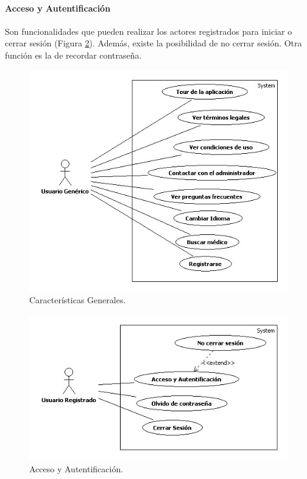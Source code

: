 		
			\paragraph{Acceso y Autentificación} %
			\label{par:acceso_y_autentificacion}
				Son funcionalidades que pueden realizar los actores registrados para iniciar o cerrar sesión (Figura \ref{fig:acceso}). Además, existe la posibilidad de no cerrar sesión. Otra función es la de recordar contraseña.
				\begin{figure}[H]
				  \centering
				    \includegraphics[width=12cm]{img/jpg/casos_uso/Generales.jpg}
				  \caption{Características Generales.}
				  \label{fig:caracteristicas}
				\end{figure}
				
				\begin{figure}[H]
				  \centering
				    \includegraphics[width=12cm]{img/jpg/casos_uso/Acceso_y_Autentificacion.jpg}
				  \caption{Acceso y Autentificación.}
				  \label{fig:acceso}
				\end{figure}
			
